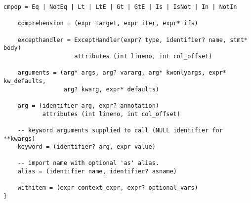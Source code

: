 \begin{lstlisting}[style=default, caption={The abstract syntax of Python}, label={python_abstract_syntax}, breaklines=true]
    cmpop = Eq | NotEq | Lt | LtE | Gt | GtE | Is | IsNot | In | NotIn

    comprehension = (expr target, expr iter, expr* ifs)

    excepthandler = ExceptHandler(expr? type, identifier? name, stmt* body)
                    attributes (int lineno, int col_offset)

    arguments = (arg* args, arg? vararg, arg* kwonlyargs, expr* kw_defaults,
                 arg? kwarg, expr* defaults)

    arg = (identifier arg, expr? annotation)
           attributes (int lineno, int col_offset)

    -- keyword arguments supplied to call (NULL identifier for **kwargs)
    keyword = (identifier? arg, expr value)

    -- import name with optional 'as' alias.
    alias = (identifier name, identifier? asname)

    withitem = (expr context_expr, expr? optional_vars)
}
\end{lstlisting}
